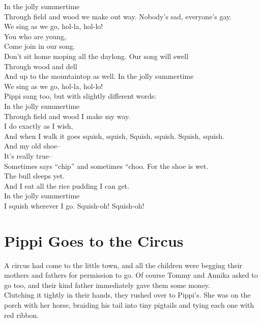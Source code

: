 \documentclass{standard}
\begin{document}
\begin{center}
In the jolly summertime\\
Through field and wood we make out way. Nobody’s sad, everyone’s gay.\\
We sing as we go, hol-la, hol-lo!\\
You who are young,\\
Come join in our song.\\
Don’t sit home moping all the daylong. Our song will swell\\
Through wood and dell\\
And up to the mountaintop as well. In the jolly summertime\\
We sing as we go, hol-la, hol-lo!\\
Pippi sang too, but with slightly different words:\\
In the jolly summertime\\
Through field and wood I make my way.\\
I do exactly as I wish,\\
And when I walk it goes squish, squish, Squish, squish. Squish, squish.\\
And my old shoe--\\
It’s really true--\\
Sometimes says “chip” and sometimes “choo. For the shoe is wet.\\
The bull sleeps yet.\\
And I eat all the rice pudding I can get.\\
In the jolly summertime\\
I squish wherever I go. Squish-oh! Squish-oh!\\
\end{center}
\newpage



\section{Pippi Goes to the Circus}
A circus had come to the little town, and all the children were begging their mothers and fathers for permission to go. Of course Tommy and Annika asked to go too, and their kind father immediately gave them some money.\\

Clutching it tightly in their hands, they rushed over to Pippi’s. She was on the porch with her horse, braiding his tail into tiny pigtails and tying each one with red ribbon.\\
\end{document}
